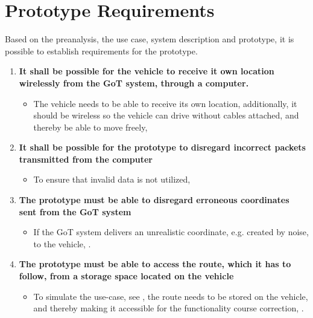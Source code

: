 \chapter{Prototype Requirements} \label{Requirements}
Based on the preanalysis, the use case, system description and prototype, it is possible to establish requirements for the prototype.

\begin{enumerate}
\item \textbf{It shall be possible for the vehicle to receive it own location wirelessly from the GoT system, through a computer.}
	\begin{itemize}
	\item[] The vehicle needs to be able to receive its own location, additionally, it should be wireless so the vehicle can drive without cables attached, and thereby be able to move freely, 
	\end{itemize}
\item \textbf{It shall be possible for the prototype to disregard incorrect packets transmitted from the computer}
	\begin{itemize}
	\item[] To ensure that invalid data is not utilized, 
	\end{itemize}
	\item \textbf{The prototype must be able to disregard erroneous coordinates sent from the GoT system}
	\begin{itemize}
	\item[] If the GoT system delivers an unrealistic coordinate, e.g. created by noise, to the vehicle, .
	\end{itemize}
\item \textbf{The prototype must be able to access the route, which it has to follow, from a storage space located on the vehicle}
	\begin{itemize}
	\item[] To simulate the use-case, see , the route needs to be stored on the vehicle, and thereby making it accessible for the functionality course correction, .
	\end{itemize}

\end{enumerate}
